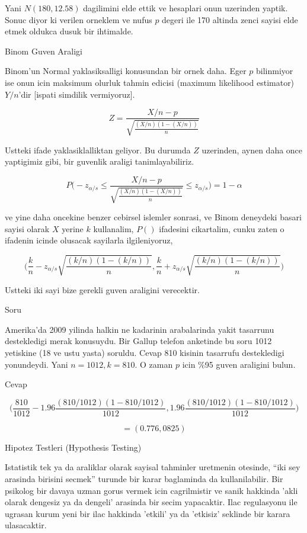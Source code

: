 \documentclass[12pt,fleqn]{article}\usepackage{../common}
\begin{document}
Yani $N(180,12.58)$ dagilimini elde ettik ve hesaplari onun uzerinden
yaptik. Sonuc diyor ki verilen orneklem ve nufus $p$ degeri ile 170 altinda
zenci sayisi elde etmek oldukca dusuk bir ihtimalde. 

Binom Guven Araligi

Binom'un Normal yaklasiksalligi konusundan bir ornek daha. Eger $p$
bilinmiyor ise onun icin maksimum olurluk tahmin edicisi (maximum
likelihood estimator) $Y/n$'dir [ispati simdilik vermiyoruz].

$$Z  = \frac{X/n - p}{\sqrt{\frac{(X/n)(1-(X/n))}{n}}}$$

Ustteki ifade yaklasiklalliktan geliyor. Bu durumda $Z$ uzerinden, aynen
daha once yaptigimiz gibi, bir guvenlik araligi tanimlayabiliriz. 

$$ 
P \bigg( 
-z_{\alpha/s} \le
\frac{X/n - p}{\sqrt{\frac{(X/n)(1-(X/n))}{n}}} \le 
z_{\alpha/s}
\bigg) =
1-\alpha
$$

ve yine daha oncekine benzer cebirsel islemler sonrasi, ve Binom deneydeki
basari sayisi olarak $X$ yerine $k$ kullanalim, $P()$ ifadesini cikartalim,
cunku zaten o ifadenin icinde olusacak sayilarla ilgileniyoruz,

$$ 
\bigg( 
\frac{k}{n}-
z_{\alpha/s}\sqrt{\frac{(k/n)(1-(k/n))}{n}}
,
\frac{k}{n} +
z_{\alpha/s} \sqrt{\frac{(k/n)(1-(k/n))}{n}}
\bigg)
$$

Ustteki iki sayi bize gerekli guven araligini verecektir. 

Soru 

Amerika'da 2009 yilinda halkin ne kadarinin arabalarinda yakit tasarrunu
destekledigi merak konusuydu. Bir Gallup telefon anketinde bu soru 1012
yetiskine (18 ve ustu yasta) soruldu. Cevap 810 kisinin tasarrufu
destekledigi yonundeydi. Yani $n=1012,k=810$. O zaman $p$ icin \%95 guven
araligini bulun.

Cevap 

$$ \bigg(
\frac{810}{1012}-1.96 \frac{(810/1012)(1-810/1012)}{1012} ,
1.96 \frac{(810/1012)(1-810/1012)}{1012}
\bigg)
$$

$$ = (0.776,0825) $$

Hipotez Testleri (Hypothesis Testing)

Istatistik tek ya da araliklar olarak sayisal tahminler uretmenin otesinde,
``iki sey arasinda birisini secmek'' turunde bir karar baglaminda da
kullanilabilir. Bir psikolog bir davaya uzman gorus vermek icin
cagrilmistir ve sanik hakkinda 'akli olarak dengesiz ya da dengeli'
arasinda bir secim yapacaktir. Ilac regulasyonu ile ugrasan kurum yeni bir
ilac hakkinda 'etkili' ya da 'etkisiz' seklinde bir karara ulasacaktir. 
\end{document}
